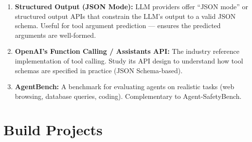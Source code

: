 \documentclass[11pt, a4paper]{article}
\begin{document}
\begin{enumerate}[leftmargin=2em]
  \item \textbf{Structured Output (JSON Mode):} LLM providers offer ``JSON mode'' or structured output APIs that constrain the LLM's output to a valid JSON schema. Useful for tool argument prediction --- ensures the predicted arguments are well-formed.

  \item \textbf{OpenAI's Function Calling / Assistants API:} The industry reference implementation of tool calling. Study its API design to understand how tool schemas are specified in practice (JSON Schema-based).

  \item \textbf{AgentBench:} A benchmark for evaluating agents on realistic tasks (web browsing, database queries, coding). Complementary to Agent-SafetyBench.
\end{enumerate}

\newpage
\section{Build Projects}
\end{document}
